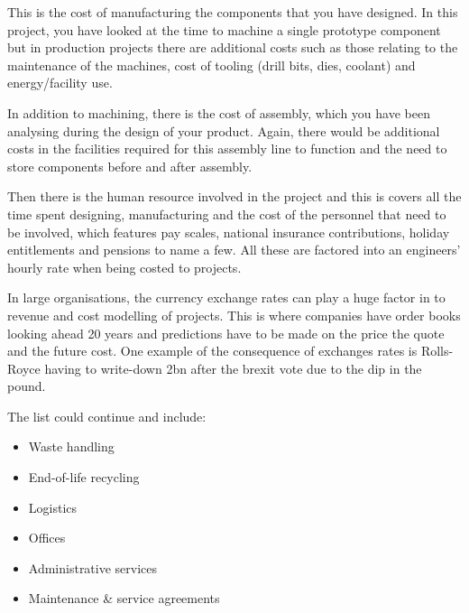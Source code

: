 This is the cost of manufacturing the components that you have designed. In this project, you have looked at the time to machine a single prototype component but in production projects there are additional costs such as those relating to the maintenance of the machines, cost of tooling (drill bits, dies, coolant) and energy/facility use.

In addition to machining, there is the cost of assembly, which you have been analysing during the design of your product. Again, there would be additional costs in the facilities required for this assembly line to function and the need to store components before and after assembly.

Then there is the human resource involved in the project and this is covers all the time spent designing, manufacturing and the cost of the personnel that need to be involved, which features pay scales, national insurance contributions, holiday entitlements and pensions to name a few. All these are factored into an engineers' hourly rate when being costed to projects.

In large organisations, the currency exchange rates can play a huge factor in to revenue and cost modelling of projects. This is where companies have order books looking ahead 20 years and predictions have to be made on the price the quote and the future cost. One example of the consequence of exchanges rates is Rolls-Royce having to write-down \textsterling2bn after the brexit vote due to the dip in the pound.\cite{tovey2016}

The list could continue and include:

\begin{itemize}
  \item Waste handling
  \item End-of-life recycling
  \item Logistics
  \item Offices
  \item Administrative services
  \item Maintenance \& service agreements
\end{itemize}
